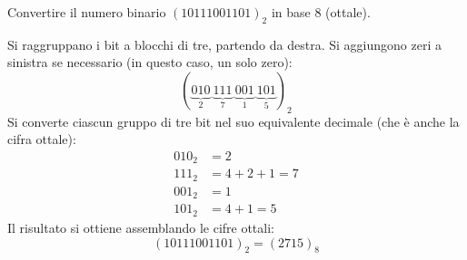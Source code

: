 \begin{Exercise}[label={ex:bin_ottale}]
    Convertire il numero binario $(10111001101)_{2}$ in base 8 (ottale).
\end{Exercise}

\begin{Answer}[ref={ex:bin_ottale}]
    Si raggruppano i bit a blocchi di tre, partendo da destra. Si aggiungono zeri a sinistra se necessario (in questo caso, un solo zero):
    \[
    (\underbrace{010}_{2}\ \underbrace{111}_{7}\ \underbrace{001}_{1}\ \underbrace{101}_{5})_{2}
    \]
    Si converte ciascun gruppo di tre bit nel suo equivalente decimale (che è anche la cifra ottale):
    \begin{align*}
        010_2 &= 2 \\
        111_2 &= 4 + 2 + 1 = 7 \\
        001_2 &= 1 \\
        101_2 &= 4 + 1 = 5
    \end{align*}
    Il risultato si ottiene assemblando le cifre ottali:
    \[
    (10111001101)_{2} = (2715)_{8}
    \]
\end{Answer}